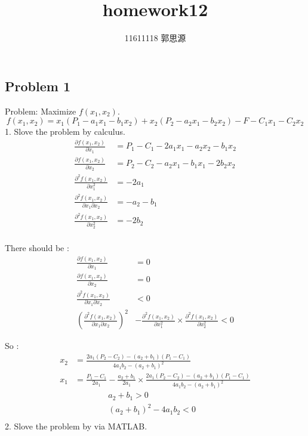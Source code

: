 \documentclass[12pt,a4paper]{article}
\begin{document}
 
\title{homework12}
	\author{11611118 郭思源}  
\begin{spacing}{1.5}%

\section{Problem 1}

Problem: Maximize $f(x_1,x_2)$.
\[
f(x_1,x_2) = x_1(P_1-a_1x_1-b_1x_2)+x_2(P_2-a_2x_1-b_2x_2)-F-C_1x_1-C_2x_2
\]
1. Slove the problem by calculus.
\begin{equation*}
	\begin{aligned}
		\frac{\partial f(x_1,x_2)}{\partial x_1} 
        &= P_1-C_1-2a_1x_1-a_2x_2-b_1x_2 \\ 
        \frac{\partial f(x_1,x_2)}{\partial x_2} 
        &= P_2-C_2-a_2x_1-b_1x_1-2b_2x_2 \\ 
        \frac{\partial^2 f(x_1,x_2)}{\partial x_1^2} 
        &= -2a_1 \\ 
        \frac{\partial^2 f(x_1,x_2)}{\partial x_1 \partial x_2} 
        &= -a_2-b_1 \\ 
        \frac{\partial^2 f(x_1,x_2)}{\partial x_2^2} 
        &= -2b_2 \\ 
	\end{aligned}
\end{equation*}

There should be :
\begin{equation*}
	\begin{aligned}
		\frac{\partial f(x_1,x_2)}{\partial x_1} &= 0 \\
        \frac{\partial f(x_1,x_2)}{\partial x_2} &= 0 \\
        \frac{\partial^2 f(x_1,x_2)}{\partial x_1 \partial x_2} &< 0 \\
        (\frac{\partial^2 f(x_1,x_2)}{\partial x_1 \partial x_2})^2 &
        - \frac{\partial^2 f(x_1,x_2)}{\partial x_1^2} \times
        \frac{\partial^2 f(x_1,x_2)}{\partial x_2^2} < 0 
	\end{aligned}
\end{equation*}

\newpage
So :
\begin{equation*}
    \begin{aligned}
        x_2 &= 
        \frac{2a_1(P_2-C_2)-(a_2+b_1)(P_1-C_1)}{4a_1b_2-(a_2+b_1)^2}  \\
        x_1 &= \frac{P_1-C_1}{2a_1} - \frac{a_2+b_1}{2a_1} \times
        \frac{2a_1(P_2-C_2)-(a_2+b_1)(P_1-C_1)}{4a_1b_2-(a_2+b_1)^2}  \\
        & \qquad \qquad a_2 + b_1 > 0 \\
        & \qquad \qquad (a_2 + b_1)^2-4a_1b_2 < 0 \\
    \end{aligned}
\end{equation*}
2. Slove the problem by via MATLAB.


\end{spacing}
\end{document}
